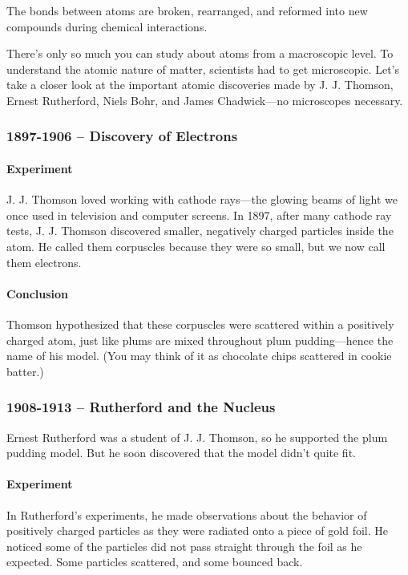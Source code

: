 \begin{definition}
    The bonds between atoms are broken, rearranged, and reformed into new compounds during chemical interactions.
\end{definition}

There's only so much you can study about atoms from a macroscopic level. To understand the atomic nature of matter, scientists had to get microscopic. Let's take a closer look at the important atomic discoveries made by J. J. Thomson, Ernest Rutherford, Niels Bohr, and James Chadwick—no microscopes necessary.

\subsubsection*{1897-1906 -- Discovery of Electrons}

\paragraph{Experiment} J. J. Thomson loved working with cathode rays—the glowing beams of light we once used in television and computer screens. In 1897, after many cathode ray tests, J. J. Thomson discovered smaller, negatively charged particles inside the atom. He called them corpuscles because they were so small, but we now call them electrons.

\paragraph{Conclusion} Thomson hypothesized that these corpuscles were scattered within a positively charged atom, just like plums are mixed throughout plum pudding—hence the name of his model. (You may think of it as chocolate chips scattered in cookie batter.)

\subsubsection*{1908-1913 -- Rutherford and the Nucleus}

Ernest Rutherford was a student of J. J. Thomson, so he supported the plum pudding model. But he soon discovered that the model didn't quite fit.

\paragraph{Experiment} In Rutherford's experiments, he made observations about the behavior of positively charged particles as they were radiated onto a piece of gold foil. He noticed some of the particles did not pass straight through the foil as he expected. Some particles scattered, and some bounced back.

